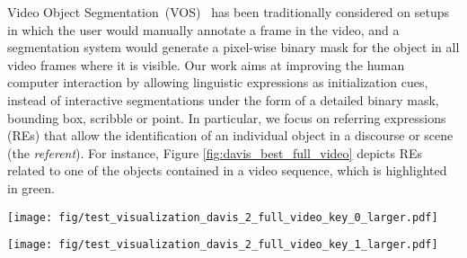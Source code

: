 \documentclass[10pt,twocolumn,letterpaper]{article}
\begin{document}
Video Object Segmentation~(VOS)~\cite{perazzi2016benchmark,xu2018youtube} has been traditionally considered on setups in which the user would manually annotate a frame in the video, and a segmentation system would generate a pixel-wise binary mask for the object in all video frames where it is visible. Our work aims at improving the human computer interaction by allowing linguistic expressions as initialization cues, instead of interactive segmentations under the form of a detailed binary mask, bounding box, scribble or point. In particular, we focus on referring expressions (REs) that allow the identification of an individual object in a discourse or scene (the \textsl{referent}). 
For instance, Figure \ref{fig:davis_best_full_video} depicts REs related to one of the objects contained in a video sequence, which is highlighted in green.

\begin{figure*}[!tbp]
\centering
\begin{minipage}[t]{0.384\textwidth}

\texttt{[image: fig/test\_visualization\_davis\_2\_full\_video\_key\_0\_larger.pdf]}
\label{fig:refcoco_best_testA}
  \end{minipage}
\begin{minipage}[t]{0.3264\textwidth}

\texttt{[image: fig/test\_visualization\_davis\_2\_full\_video\_key\_1\_larger.pdf]}


  \end{minipage}
  \vspace*{-\baselineskip}
  \caption{Video sequences for DAVIS 2017 with language queries and our results. The first column shows a reference frame, the second to third columns depict the masks produced by our model when given the language query shown on top. Finally, the fourth to fifth columns show the results for the language query shown on top of these columns, which refers to another object of the video sequence.
  }
  \label{fig:davis_best_full_video}
\end{figure*}
\end{document}
